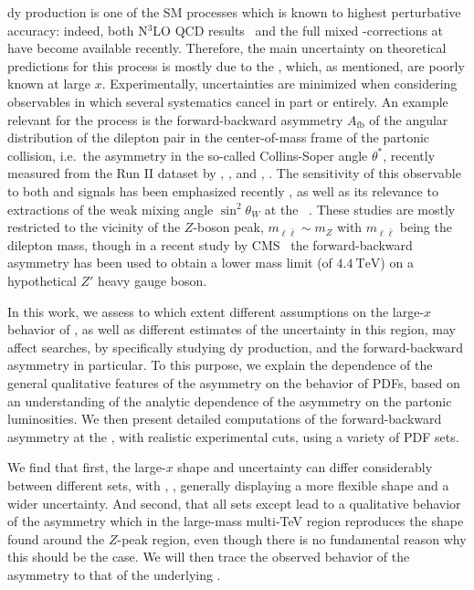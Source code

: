 \acrlong{dy} production is one of the SM processes which is known to highest
perturbative accuracy: indeed, both N$^3$LO QCD results~\cite{Duhr:2021vwj} and
the full mixed \qcd-\ew corrections at \nnlo
\cite{Buccioni:2020cfi,Buccioni:2022kgy,Bonciani:2020tvf,Bonciani:2021zzf,Armadillo:2022bgm}
have become available recently.
%
Therefore, the main uncertainty on theoretical predictions for this process is
mostly due to the \pdfs, which, as mentioned, are poorly known at large $x$.
%
Experimentally, uncertainties are minimized when considering observables in
which several systematics cancel in part or entirely.
%
An example relevant for the \dy process is the forward-backward asymmetry
$A_{\text{fb}}$ of the angular distribution of the dilepton pair in the
center-of-mass frame of the partonic collision, i.e.\ the asymmetry in the
so-called Collins-Soper angle $\theta^*$, recently measured from the Run II
dataset by \atlas, \cite{ATLAS:2017rue}, and \cms, \cite{CMS:2022uul}.
%
The sensitivity of this observable to both \pdfs and \bsm signals has
been emphasized recently
\cite{Fiaschi:2021sin,Fiaschi:2021okg,Accomando:2019vqt,Accomando:2018nig}, as
well as its relevance to extractions of the weak mixing angle $\sin^2\theta_W$
at the \lhc~\cite{CMS:2018ktx}.
These studies  are mostly restricted to the vicinity of the $Z$-boson peak,
$m_{\ell\bar{\ell}} \sim m_Z$ with $m_{\ell\bar{\ell}}$ being the dilepton
mass, though in a recent study by CMS~\cite{CMS:2022uul} the forward-backward
asymmetry has been used to obtain a lower mass limit (of
$\SI{4.4}{\tera\electronvolt}$) on a hypothetical $Z'$ heavy gauge boson.

In this work, we assess to which extent different assumptions on the large-$x$
behavior of \pdfs, as well as different estimates of the \pdf uncertainty in
this region, may affect \bsm searches, by specifically studying \nc
\acrlong{dy} production, and the forward-backward asymmetry in particular.
To this purpose, we explain the dependence of the general qualitative features
of the asymmetry on the behavior of PDFs, based on an understanding  of the
analytic dependence of the asymmetry on the partonic luminosities.
%
We then present detailed computations of the forward-backward asymmetry at the
\lhc, with realistic experimental cuts, using a variety of PDF sets.

We find that first, the large-$x$ \pdf shape and uncertainty can differ
considerably between different \pdf sets, with ,
\cite{Ball:2021leu}, generally displaying a more flexible shape and a wider
uncertainty.
%
And second, that all \pdf sets except  lead to a qualitative
behavior of the asymmetry which in the large-mass multi-TeV region reproduces
the shape found around the $Z$-peak region, even though there is no fundamental
reason why this should be the case.
%
We will then trace the observed behavior of the asymmetry to that of the
underlying \pdfs.
